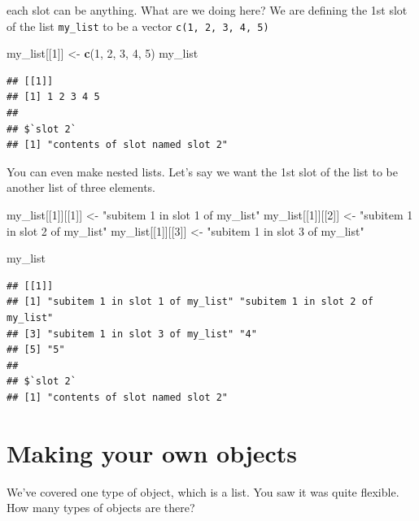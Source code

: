 \documentclass[]{book}
\newenvironment{Shaded}{\begin{snugshade}}{\end{snugshade}}
\newcommand{\KeywordTok}[1]{\textcolor[rgb]{0.13,0.29,0.53}{\textbf{#1}}}
\newcommand{\DecValTok}[1]{\textcolor[rgb]{0.00,0.00,0.81}{#1}}
\newcommand{\StringTok}[1]{\textcolor[rgb]{0.31,0.60,0.02}{#1}}
\newcommand{\NormalTok}[1]{#1}
\theoremstyle{definition}
\theoremstyle{definition}
\theoremstyle{definition}
\theoremstyle{remark}
\begin{document}
each slot can be anything. What are we doing here? We are defining the
1st slot of the list \texttt{my\_list} to be a vector
\texttt{c(1,\ 2,\ 3,\ 4,\ 5)}

\begin{Shaded}
\begin{Highlighting}[]
\NormalTok{my_list[[}\DecValTok{1}\NormalTok{]] <-}\StringTok{ }\KeywordTok{c}\NormalTok{(}\DecValTok{1}\NormalTok{, }\DecValTok{2}\NormalTok{, }\DecValTok{3}\NormalTok{, }\DecValTok{4}\NormalTok{, }\DecValTok{5}\NormalTok{)}
\NormalTok{my_list}
\end{Highlighting}
\end{Shaded}

\begin{verbatim}
## [[1]]
## [1] 1 2 3 4 5
## 
## $`slot 2`
## [1] "contents of slot named slot 2"
\end{verbatim}

You can even make nested lists. Let's say we want the 1st slot of the
list to be another list of three elements.

\begin{Shaded}
\begin{Highlighting}[]
\NormalTok{my_list[[}\DecValTok{1}\NormalTok{]][[}\DecValTok{1}\NormalTok{]] <-}\StringTok{ "subitem 1 in slot 1 of my_list"}
\NormalTok{my_list[[}\DecValTok{1}\NormalTok{]][[}\DecValTok{2}\NormalTok{]] <-}\StringTok{ "subitem 1 in slot 2 of my_list"}
\NormalTok{my_list[[}\DecValTok{1}\NormalTok{]][[}\DecValTok{3}\NormalTok{]] <-}\StringTok{ "subitem 1 in slot 3 of my_list"}

\NormalTok{my_list}
\end{Highlighting}
\end{Shaded}

\begin{verbatim}
## [[1]]
## [1] "subitem 1 in slot 1 of my_list" "subitem 1 in slot 2 of my_list"
## [3] "subitem 1 in slot 3 of my_list" "4"                             
## [5] "5"                             
## 
## $`slot 2`
## [1] "contents of slot named slot 2"
\end{verbatim}

\section{Making your own objects}\label{making-your-own-objects}

We've covered one type of object, which is a list. You saw it was quite
flexible. How many types of objects are there?
\end{document}
